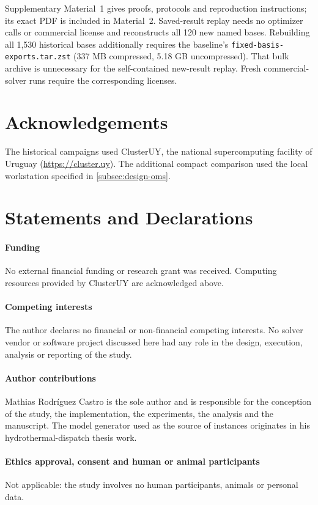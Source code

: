 \documentclass[11pt]{article}
\theoremstyle{definition}
\theoremstyle{remark}
\begin{document}
Supplementary Material~1 gives proofs, protocols and reproduction instructions;
its exact PDF is included in Material~2. Saved-result replay needs no optimizer
calls or commercial license and reconstructs all 120 new named bases.
Rebuilding all 1,530 historical bases additionally requires the baseline's
\texttt{fixed-basis-exports.tar.zst} (337 MB compressed, 5.18 GB uncompressed).
That bulk archive is unnecessary for the self-contained new-result replay.
Fresh commercial-solver runs require the corresponding licenses.

\section*{Acknowledgements}
The historical campaigns used ClusterUY, the national supercomputing facility of Uruguay
(\url{https://cluster.uy}). The additional compact comparison used the local workstation
specified in \cref{subsec:design-oms}.

\section*{Statements and Declarations}
\paragraph{Funding}
No external financial funding or research grant was received. Computing resources
provided by ClusterUY are acknowledged above.
\paragraph{Competing interests}
The author declares no financial or non-financial competing interests. No solver vendor
or software project discussed here had any role in the design, execution, analysis or
reporting of the study.
\paragraph{Author contributions}
Mathias Rodr\'iguez Castro is the sole author and is responsible for the conception of
the study, the implementation, the experiments, the analysis and the manuscript. The
model generator used as the source of instances originates in his hydrothermal-dispatch
thesis work.
\paragraph{Ethics approval, consent and human or animal participants}
Not applicable: the study involves no human participants, animals or personal data.
\end{document}
